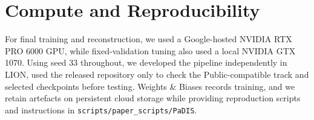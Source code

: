 \section{Compute and Reproducibility}
For final training and reconstruction, we used a Google-hosted NVIDIA RTX PRO 6000 GPU, while fixed-validation tuning also used a local NVIDIA GTX 1070. Using seed 33 throughout, we developed the pipeline independently in LION, used the released repository only to check the Public-compatible track and selected checkpoints before testing. Weights \& Biases records training, and we retain artefacts on persistent cloud storage while providing reproduction scripts and instructions in \texttt{scripts/paper\_scripts/PaDIS}.

